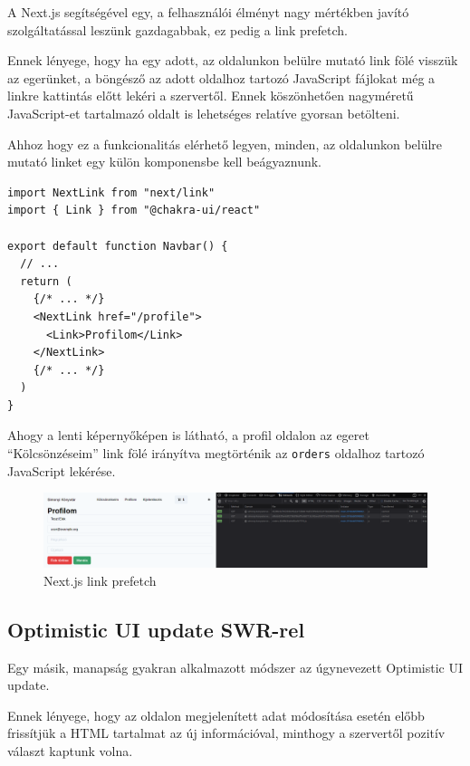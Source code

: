 A Next.js segítségével egy, a felhasználói élményt nagy mértékben javító szolgáltatással leszünk gazdagabbak, ez pedig a link prefetch.

Ennek lényege, hogy ha egy adott, az oldalunkon belülre mutató link fölé visszük az egerünket, a böngésző az adott oldalhoz tartozó JavaScript
fájlokat még a linkre kattintás előtt lekéri a szervertől.
Ennek köszönhetően nagyméretű JavaScript-et tartalmazó oldalt is lehetséges relatíve gyorsan betölteni.

Ahhoz hogy ez a funkcionalitás elérhető legyen, minden, az oldalunkon belülre mutató linket egy külön komponensbe kell beágyaznunk.

\begin{lstlisting}[caption=NextLink használata Chakra UI linkkel együtt]
import NextLink from "next/link"
import { Link } from "@chakra-ui/react"

export default function Navbar() {
  // ...
  return (
    {/* ... */}
    <NextLink href="/profile">
      <Link>Profilom</Link>
    </NextLink>
    {/* ... */}
  )
}
\end{lstlisting}

Ahogy a lenti képernyőképen is látható, a profil oldalon az egeret ``Kölcsönzéseim'' link fölé irányítva megtörténik az \lstinline|orders|
oldalhoz tartozó JavaScript lekérése.

\begin{figure}[!ht]
  \centering
  \includegraphics[width=150mm, keepaspectratio]{figures/next-link-cache.png}
  \caption{Next.js link prefetch}
  \label{fig:LinkPrefetch}
\end{figure}

\subsection{Optimistic UI update SWR-rel}

Egy másik, manapság gyakran alkalmazott módszer az úgynevezett Optimistic UI update.

Ennek lényege, hogy az oldalon megjelenített adat módosítása esetén előbb frissítjük a HTML tartalmat az új információval, minthogy a szervertől
pozitív választ kaptunk volna.

